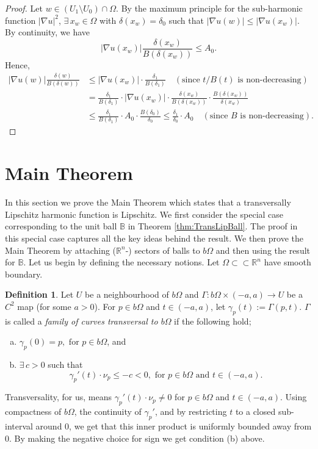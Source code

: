 \documentclass[12pt,a4paper]{amsart}
\numberwithin{equation}{section}
\theoremstyle{definition}
\newtheorem{definition}[equation]{Definition}
\begin{document}
\begin{proof} Let $w\in \left(U_1\setminus U_0\right)\cap\Omega $. By the maximum principle for the sub-harmonic function ${\left\lvert{\nabla u}\right\rvert}^2$,
$\exists\, x_w\in \Omega$ with $\delta(x_w) = \delta_0$ such that ${\left\lvert{\nabla u(w)}\right\rvert} \le {\left\lvert{\nabla u(x_w)}\right\rvert}$. By continuity, we have
\[{\left\lvert{\nabla u(x_w)}\right\rvert}\frac{\delta(x_w)}{B(\delta(x_w))} \le A_0.\]
Hence,
\begin{align*}
{\left\lvert{\nabla u(w)}\right\rvert}\frac{\delta(w)}{B(\delta(w))}&\le {\left\lvert{\nabla u(x_w)}\right\rvert}\cdot \frac{\delta_1}{B(\delta_1)} \quad(\text{since } t/B(t) \text{ is non-decreasing})\\
&=\frac{\delta_1}{B(\delta_1)} \cdot {\left\lvert{\nabla u(x_w)}\right\rvert} \cdot \frac{\delta(x_w)}{B(\delta(x_w))}\cdot\frac{B(\delta(x_w))}{\delta(x_w)}\\
&\le \frac{\delta_1}{B(\delta_1)}\cdot A_0\cdot\frac{B(\delta_0)}{\delta_0} \le \frac{\delta_1}{\delta_0}\cdot A_0 \quad(\text{since } B \text{ is non-decreasing}).
\end{align*}
\end{proof}	

\section{Main Theorem}

In this section we prove the Main Theorem which states that a transversally Lipschitz harmonic function is Lipschitz. We first consider the special case corresponding to the unit ball $\mathbb{B}$ in Theorem 
\ref{thm:TransLipBall}. The proof in this special case captures all the key ideas behind the result. We then prove the Main Theorem by attaching ($\mathbb{R}^n$-) sectors of balls to $b\Omega$ and 
then using the result for $\mathbb{B}$. Let us begin by defining the necessary notions. Let $\Omega \subset\subset \mathbb{R}^n$ have smooth boundary.

\begin{definition}\label{defn:FamTransCurves}
Let $U$ be a neighbourhood of $b\Omega$ and $\Gamma : b\Omega \times (-a,a) \to U$ be a $C^2$ map (for some $a>0$). For $p\in b\Omega$ and $t\in (-a,a)$, let $\gamma_p(t) := \Gamma(p,t)$.
$\Gamma$ is called a \textit{family of curves transversal to $\mathit{b\Omega}$} if the following hold;
\begin{enumerate}[(a)]
\item $\gamma_p(0) = p, \text{ for } p\in b\Omega$, and
\item $\exists\, c>0$ such that
\[\gamma_p'(t) \cdot \nu_p \le -c < 0, \text{ for }  p\in b\Omega \text{ and } t\in (-a,a).\]
\end{enumerate}
\end{definition}
Transversality, for us, means $\gamma_p'(t)\cdot\nu_p \ne 0$ for $p\in b\Omega$ and $t\in (-a,a)$. Using compactness of $b\Omega$, the continuity of 
$\gamma_p'$, and by restricting $t$ to a closed sub-interval around $0$, we get that this inner product is uniformly bounded away from $0$. By making the negative choice for sign we get condition (b) above.
\end{document}

